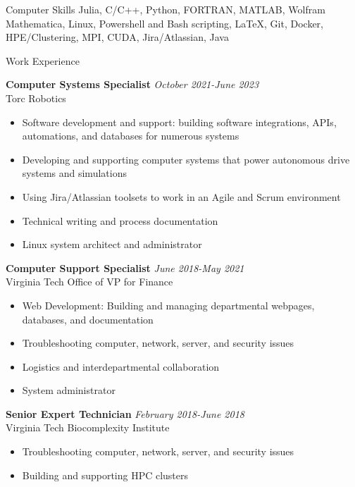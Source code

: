 \documentclass{resume} %
\begin{document}
\begin{rSection}{Computer Skills}
    Julia, C/C++, Python, FORTRAN, MATLAB, Wolfram Mathematica, Linux, Powershell and Bash scripting, \LaTeX, Git, Docker, HPE/Clustering, MPI, CUDA, Jira/Atlassian, Java
\end{rSection}

\begin{rSection}{Work Experience}

\textbf{Computer Systems Specialist} \hfill \textit{October 2021-June 2023} \\
Torc Robotics
 \begin{itemize}
    \itemsep -3pt {} 
     \item Software development and support: building software integrations, APIs, automations, and databases for numerous systems
     \item Developing and supporting computer systems that power autonomous drive systems and simulations
     \item Using Jira/Atlassian toolsets to work in an Agile and Scrum environment
     \item Technical writing and process documentation
     \item Linux system architect and administrator
 \end{itemize}
 
\textbf{Computer Support Specialist} \hfill \textit{June 2018-May 2021} \\
Virginia Tech Office of VP for Finance
 \begin{itemize}
    \itemsep -3pt {} 
     \item Web Development: Building and managing departmental webpages, databases, and documentation
     \item Troubleshooting computer, network, server, and security issues
     \item Logistics and interdepartmental collaboration
     \item System administrator
 \end{itemize}

\vspace{10pt}

 \textbf{Senior Expert Technician} \hfill \textit{February 2018-June 2018} \\
 Virginia Tech Biocomplexity Institute
  \begin{itemize}
     \itemsep -3pt {} 
      \item Troubleshooting computer, network, server, and security issues
      \item Building and supporting HPC clusters
  \end{itemize}


\end{rSection}
\end{document}
